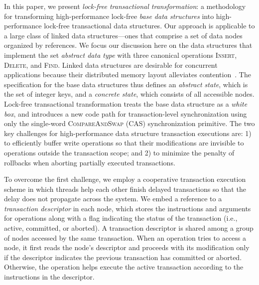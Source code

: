 \documentclass[]{sig-alternate-05-2015}
\begin{document}
In this paper, we present \emph{lock-free transactional transformation}: a methodology for transforming high-performance lock-free \emph{base data structures} into high-performance lock-free transactional data structures.
Our approach is applicable to a large class of linked data structures---ones that comprise a set of data nodes organized by references. 
We focus our discussion here on the data structures that implement the set \emph{abstract data type} with three canonical operations \textsc{Insert}, \textsc{Delete}, and \textsc{Find}.
Linked data structures are desirable for concurrent applications because their distributed memory layout alleviates contention~\cite{shavit1999scalable}.
The specification for the base data structures thus defines an \emph{abstract state}, which is the set of integer keys, and a \emph{concrete state}, which consists of all accessible nodes.
Lock-free transactional transformation treats the base data structure as a \emph{white box}, and introduces a new code path for transaction-level synchronization using only the single-word \textsc{CompareAndSwap} (CAS) synchronization primitive.
The two key challenges for high-performance data structure transaction executions are: 1) to efficiently buffer write operations so that their modifications are invisible to operations outside the transaction scope; and 2) to minimize the penalty of rollbacks when aborting partially executed transactions. 

To overcome the first challenge, we employ a cooperative transaction execution scheme in which threads help each other finish delayed transactions so that the delay does not propagate across the system.
We embed a reference to a \emph{transaction descriptor} in each node, which stores the instructions and arguments for operations along with a flag indicating the status of the transaction (i.e., active, committed, or aborted).
A transaction descriptor is shared among a group of nodes accessed by the same transaction. 
When an operation tries to access a node, it first reads the node's descriptor and proceeds with its modification only if the descriptor indicates the previous transaction has committed or aborted. 
Otherwise, the operation helps execute the active transaction according to the instructions in the descriptor.
\end{document}
